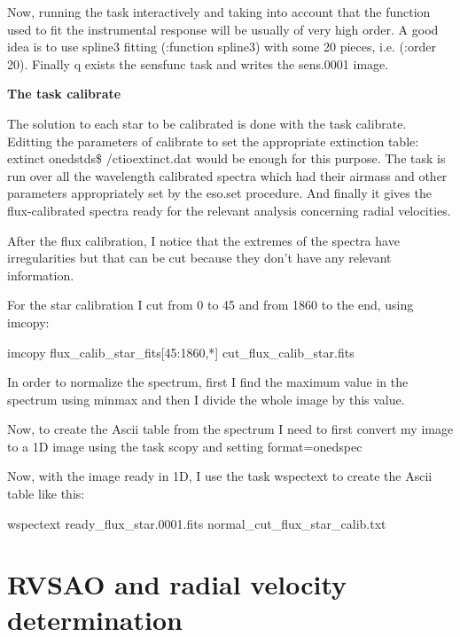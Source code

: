 Now, running the task interactively and taking into account that the function used to fit the instrumental response will be usually of very high order. A good idea is to use spline3 fitting (:function spline3) with some 20 pieces, i.e. (:order 20).
Finally q exists the sensfunc task and writes the sens.0001 image.

\textbf{The task calibrate}

The solution to each star to be calibrated is done with the task calibrate. Editting the parameters of calibrate to set the appropriate extinction table: extinct onedstds\$ /ctioextinct.dat would be enough for this purpose. The task is run over all the wavelength calibrated spectra which had their airmass and other parameters appropriately set by the eso.set procedure. And finally it gives the flux-calibrated spectra ready for the relevant analysis concerning radial velocities.

After the flux calibration, I notice that the extremes of the spectra have irregularities but that can be cut because they don't have any relevant information.

For the star calibration I cut from 0 to 45 and from 1860 to the end, using imcopy:

\begin{center}
imcopy flux\_calib\_star\_fits[45:1860,*] cut\_flux\_calib\_star.fits
\end{center}

In order to normalize the spectrum, first I find the maximum value in the spectrum using minmax and then I divide the whole image by this value.

Now, to create the Ascii table from the spectrum I need to first convert my image to a 1D image using the task scopy and setting format=onedspec

Now, with the image ready in 1D, I use the task wspectext to create the Ascii table like this:

\begin{center}
wspectext ready\_flux\_star.0001.fits normal\_cut\_flux\_star\_calib.txt
\end{center}

\section{RVSAO and radial velocity determination}